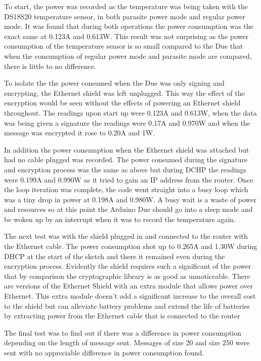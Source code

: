 To start, the power was recorded as the temperature was being taken with the DS18S20 temperature sensor, in both parasite power mode and regular power mode. It was found that during both operations the power consumption was the exact same at 0.123A and 0.613W. This result was not surprising as the power consumption of the temperature sensor is so small compared to the Due that when the consumption of regular power mode and parasite mode are compared, there is little to no difference.

To isolate the the power consumed when the Due was only signing and encrypting, the Ethernet shield was left unplugged. This way the effect of the encryption would be seen without the effects of powering an Ethernet shield throughout. 
The readings upon start up were 0.123A and 0.613W, when the data was being given a signature the readings were 0.17A and 0.970W and when the message was encrypted it rose to 0.20A and 1W. 

In addition the power consumption when the Ethernet shield was attached but had no cable plugged was recorded. The power consumed during the signature and encryption process was the same as above but during DCHP the readings were 0.199A and 0.990W as it tried to gain an IP address from the router. Once the loop iteration was complete, the code went straight into a busy loop which was a tiny drop in power at 0.198A and 0.980W. A busy wait is a waste of power and resources so at this point the Arduino Due should go into a sleep mode and be woken up by an interrupt when it was to record the temperature again. 

The next test was with the shield plugged in and connected to the router with the Ethernet cable. The power consumption shot up to 0.265A and 1.30W during DHCP at the start of the sketch and there it remained even during the encryption process. Evidently the shield requires such a significant of the power that by comparison the cryptographic library is as good as unnoticeable. There are versions of the Ethernet Shield with an extra module that allows power over Ethernet. This extra module doesn't add a significant increase to the overall cost to the shield but can alleviate battery problems and extend the life of batteries by extracting power from the Ethernet cable that is connected to the router

The final test was to find out if there was a difference in power consumption depending on the length of message sent. Messages of size 20 and size 250 were sent with no appreciable difference in power consumption found.


